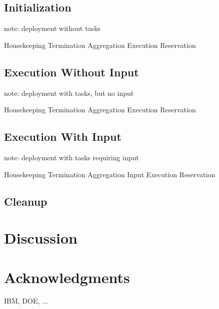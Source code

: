 \documentclass{article}
\begin{document}
\subsection*{Initialization }
note: deployment without tasks

Housekeeping
Termination
Aggregation
Execution
Reservation

\subsection*{Execution Without Input}
note: deployment with tasks, but no input

Housekeeping
Termination
Aggregation
Execution
Reservation

\subsection*{Execution With Input}
note: deployment with tasks requiring input

Housekeeping
Termination
Aggregation
Input
Execution
Reservation


\subsection*{Cleanup}

\section*{Discussion}

\section*{Acknowledgments}

IBM, DOE, ...





\GTDBib[plain]


\listActions
\listPurchases
\listContacts
\listProjects

\GTDoutput
\end{document}
